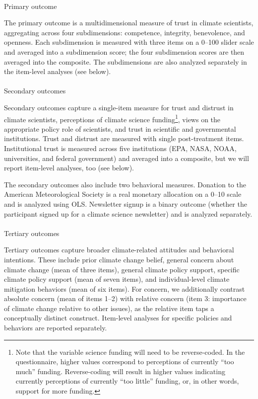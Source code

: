 \documentclass[
  letterpaper,
  DIV=11,
  numbers=noendperiod]{scrartcl}
\makeatletter
\let\oldparagraph\paragraph
\renewcommand{\paragraph}{
    \@ifstar
      \xxxParagraphStar
      \xxxParagraphNoStar
  }
\newcommand{\xxxParagraphStar}[1]{\oldparagraph*{#1}\mbox{}}
\newcommand{\xxxParagraphNoStar}[1]{\oldparagraph{#1}\mbox{}}
\makeatother
\begin{document}
\paragraph{Primary outcome}\label{primary-outcome}

The primary outcome is a multidimensional measure of trust in climate
scientists, aggregating across four subdimensions: competence,
integrity, benevolence, and openness. Each subdimension is measured with
three items on a 0--100 slider scale and averaged into a subdimension
score; the four subdimension scores are then averaged into the
composite. The subdimensions are also analyzed separately in the
item-level analyses (see below).

\paragraph{Secondary outcomes}\label{secondary-outcomes}

Secondary outcomes capture a single-item measure for trust and distrust
in climate scientists, perceptions of climate science
funding\footnote{Note that the variable science funding will need to be
  reverse-coded. In the questionnaire, higher values correspond to
  perceptions of currently ``too much'' funding. Reverse-coding will
  result in higher values indicating currently perceptions of currently
  ``too little'' funding, or, in other words, support for more funding.},
views on the appropriate policy role of scientists, and trust in
scientific and governmental institutions. Trust and distrust are
measured with single post-treatment items. Institutional trust is
measured across five institutions (EPA, NASA, NOAA, universities, and
federal government) and averaged into a composite, but we will report
item-level analyses, too (see below).

The secondary outcomes also include two behavioral measures. Donation to
the American Meteorological Society is a real monetary allocation on a
0--10 scale and is analyzed using OLS. Newsletter signup is a binary
outcome (whether the participant signed up for a climate science
newsletter) and is analyzed separately.

\paragraph{Tertiary outcomes}\label{tertiary-outcomes}

Tertiary outcomes capture broader climate-related attitudes and
behavioral intentions. These include prior climate change belief,
general concern about climate change (mean of three items), general
climate policy support, specific climate policy support (mean of seven
items), and individual-level climate mitigation behaviors (mean of six
items). For concern, we additionally contrast absolute concern (mean of
items 1--2) with relative concern (item 3: importance of climate change
relative to other issues), as the relative item taps a conceptually
distinct construct. Item-level analyses for specific policies and
behaviors are reported separately.
\end{document}
